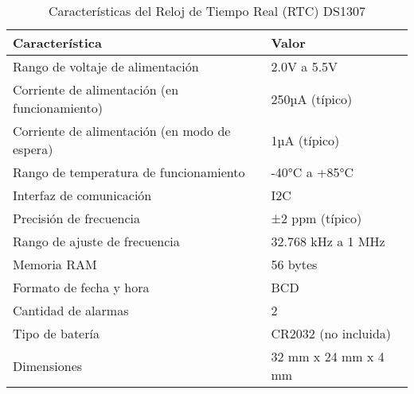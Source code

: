 \begin{table}[H]
\centering
\caption{Características del Reloj de Tiempo Real (RTC) DS1307}
\label{tab:rtc_ds1307_caracteristicas}
\begin{tabular}{|l|l|}
\hline
\textbf{Característica}                              & \textbf{Valor}                       \\ \hline
Rango de voltaje de alimentación                     & 2.0V a 5.5V                          \\ \hline
Corriente de alimentación (en funcionamiento)        & 250µA (típico)                       \\ \hline
Corriente de alimentación (en modo de espera)        & 1µA (típico)                         \\ \hline
Rango de temperatura de funcionamiento               & -40°C a +85°C                        \\ \hline
Interfaz de comunicación                             & I2C                                  \\ \hline
Precisión de frecuencia                              & ±2 ppm (típico)                      \\ \hline
Rango de ajuste de frecuencia                        & 32.768 kHz a 1 MHz                   \\ \hline
Memoria RAM                                          & 56 bytes                             \\ \hline
Formato de fecha y hora                              & BCD                                  \\ \hline
Cantidad de alarmas                                  & 2                                    \\ \hline
Tipo de batería                                      & CR2032 (no incluida)                 \\ \hline
Dimensiones                                          & 32 mm x 24 mm x 4 mm                 \\ \hline
\end{tabular}
\end{table}